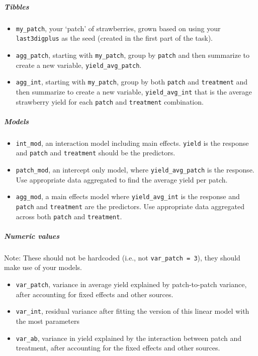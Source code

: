 \documentclass[
  openany]{book}
\begin{document}
\hypertarget{tibbles}{%
\subparagraph{Tibbles}\label{tibbles}}

\begin{itemize}
\item
  \texttt{my\_patch}, your `patch' of strawberries, grown based on using your \texttt{last3digplus} as the seed (created in the first part of the task).
\item
  \texttt{agg\_patch}, starting with \texttt{my\_patch}, group by \texttt{patch} and then summarize to create a new variable, \texttt{yield\_avg\_patch}.
\item
  \texttt{agg\_int}, starting with \texttt{my\_patch}, group by both \texttt{patch} and \texttt{treatment} and then summarize to create a new variable, \texttt{yield\_avg\_int} that is the average strawberry yield for each \texttt{patch} and \texttt{treatment} combination.
\end{itemize}

\hypertarget{models}{%
\subparagraph{Models}\label{models}}

\begin{itemize}
\item
  \texttt{int\_mod}, an interaction model including main effects. \texttt{yield} is the response and \texttt{patch} and \texttt{treatment} should be the predictors.
\item
  \texttt{patch\_mod}, an intercept only model, where \texttt{yield\_avg\_patch} is the response. Use appropriate data aggregated to find the average yield per patch.
\item
  \texttt{agg\_mod}, a main effects model where \texttt{yield\_avg\_int} is the response and \texttt{patch} and \texttt{treatment} are the predictors. Use appropriate data aggregated across both \texttt{patch} and \texttt{treatment}.
\end{itemize}

\hypertarget{numeric-values}{%
\subparagraph{Numeric values}\label{numeric-values}}

Note: These should not be hardcoded (i.e., not \texttt{var\_patch\ =\ 3}), they should make use of your models.

\begin{itemize}
\item
  \texttt{var\_patch}, variance in average yield explained by patch-to-patch variance, after accounting for fixed effects and other sources.
\item
  \texttt{var\_int}, residual variance after fitting the version of this linear model with the most parameters
\item
  \texttt{var\_ab}, variance in yield explained by the interaction between patch and treatment, after accounting for the fixed effects and other sources.
\end{itemize}
\end{document}
